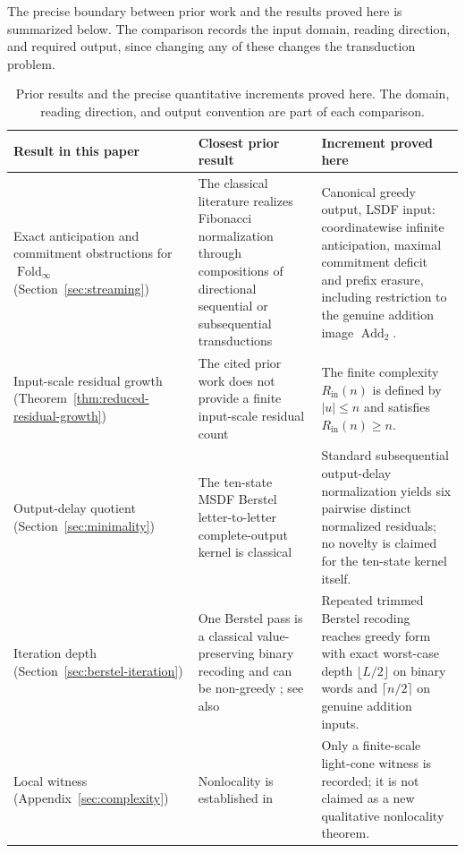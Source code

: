 \documentclass[11pt,letterpaper]{article}
\numberwithin{equation}{section}
\theoremstyle{plain}
\theoremstyle{definition}
\theoremstyle{remark}
\DeclareMathOperator{\Fold}{Fold}
\newcommand{\AddTwo}{\operatorname{Add}_{2}}
\begin{document}
The precise boundary between prior work and the results proved here is
summarized below.  The comparison records the input domain, reading direction,
and required output, since changing any of these changes the transduction
problem.
\begin{table}[htbp]
\centering
\small
\begin{tabular}{>{\raggedright\arraybackslash}p{}
                >{\raggedright\arraybackslash}p{}
                >{\raggedright\arraybackslash}p{}}
\hline
Result in this paper & Closest prior result & Increment proved here\\
\hline
Exact anticipation and commitment obstructions for $\Fold_\infty$
(Section~\ref{sec:streaming})
& The classical literature realizes Fibonacci normalization through
compositions of directional sequential or subsequential transductions
\cite{Frougny1992NumbersAutomata,Sakarovitch1987EasyMultiplications}
& Canonical greedy output, LSDF input: coordinatewise infinite anticipation,
maximal commitment deficit and prefix erasure, including restriction to the
genuine addition image $\AddTwo$.\\
Input-scale residual growth (Theorem~\ref{thm:reduced-residual-growth})
& The cited prior work does not provide a finite input-scale residual count
& The finite complexity $R_{\mathrm{in}}(n)$ is defined by $|u|\le n$ and
satisfies $R_{\mathrm{in}}(n)\ge n$.\\
Output-delay quotient (Section~\ref{sec:minimality})
& The ten-state MSDF Berstel letter-to-letter complete-output kernel is
classical \cite{Berstel1986FibonacciWords,Frougny1999OnlineAddition}
& Standard subsequential output-delay normalization yields six pairwise
distinct normalized residuals; no novelty is claimed for the ten-state
kernel itself.\\
Iteration depth (Section~\ref{sec:berstel-iteration})
& One Berstel pass is a classical value-preserving binary recoding and can be
non-greedy \cite[Prop.~13 and Cor.~4]{Frougny1999OnlineAddition}; see also
\cite{LabbeLepsova2023FibonacciTwosComplement}
& Repeated trimmed Berstel recoding reaches greedy form with exact worst-case
depth $\lfloor L/2\rfloor$ on binary words and $\lceil n/2\rceil$ on genuine
addition inputs.\\
Local witness (Appendix~\ref{sec:complexity})
& Nonlocality is established in \cite[Prop.~14]{Frougny1999OnlineAddition}
& Only a finite-scale light-cone witness is recorded; it is not claimed as a
new qualitative nonlocality theorem.\\
\hline
\end{tabular}
\caption{Prior results and the precise quantitative increments proved here.
The domain, reading direction, and output convention are part of each
comparison.}
\label{tab:prior-art-comparison}
\end{table}
\end{document}

